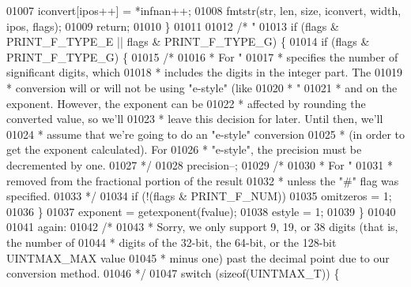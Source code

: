 \begin{DoxyCode}
{{{{{01007             iconvert[ipos++] = *infnan++;
01008         fmtstr(str, len, size, iconvert, width, ipos, flags);
01009         \textcolor{keywordflow}{return};
01010     \}
01011 
01012     \textcolor{comment}{/* "%
01013     \textcolor{keywordflow}{if} (flags & PRINT\_F\_TYPE\_E || flags & PRINT\_F\_TYPE\_G) \{
01014         \textcolor{keywordflow}{if} (flags & PRINT\_F\_TYPE\_G) \{
01015             \textcolor{comment}{/*}
01016 \textcolor{comment}{             * For "%
01017 \textcolor{comment}{             * specifies the number of significant digits, which}
01018 \textcolor{comment}{             * includes the digits in the integer part.  The}
01019 \textcolor{comment}{             * conversion will or will not be using "e-style" (like}
01020 \textcolor{comment}{             * "%
01021 \textcolor{comment}{             * and on the exponent.  However, the exponent can be}
01022 \textcolor{comment}{             * affected by rounding the converted value, so we'll}
01023 \textcolor{comment}{             * leave this decision for later.  Until then, we'll}
01024 \textcolor{comment}{             * assume that we're going to do an "e-style" conversion}
01025 \textcolor{comment}{             * (in order to get the exponent calculated).  For}
01026 \textcolor{comment}{             * "e-style", the precision must be decremented by one.}
01027 \textcolor{comment}{             */}
01028             precision--;
01029             \textcolor{comment}{/*}
01030 \textcolor{comment}{             * For "%
01031 \textcolor{comment}{             * removed from the fractional portion of the result}
01032 \textcolor{comment}{             * unless the "#" flag was specified.}
01033 \textcolor{comment}{             */}
01034             \textcolor{keywordflow}{if} (!(flags & PRINT\_F\_NUM))
01035                 omitzeros = 1;
01036         \}
01037         exponent = getexponent(fvalue);
01038         estyle = 1;
01039     \}
01040 
01041 again:
01042     \textcolor{comment}{/*}
01043 \textcolor{comment}{     * Sorry, we only support 9, 19, or 38 digits (that is, the number of}
01044 \textcolor{comment}{     * digits of the 32-bit, the 64-bit, or the 128-bit UINTMAX\_MAX value}
01045 \textcolor{comment}{     * minus one) past the decimal point due to our conversion method.}
01046 \textcolor{comment}{     */}
01047     \textcolor{keywordflow}{switch} (\textcolor{keyword}{sizeof}(UINTMAX\_T)) \{
}}}}}}}}}
\end{DoxyCode}
